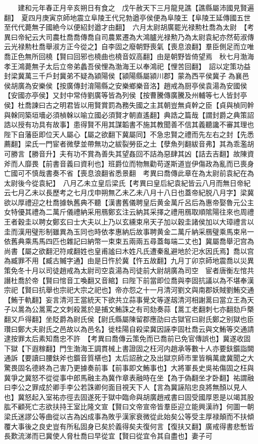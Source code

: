 　　建和元年春正月辛亥朔日有食之　戊午赦天下三月龍見譙【譙縣屬沛國見賢遍翻】　夏四月庚寅京師地震立阜陵王代兄勃遒亭侯便為阜陵王【阜陵王延傳國五世至代代薨無子國絶今以便紹封遒才由翻】　六月太尉胡廣罷光禄勲杜喬為太尉　【考異曰帝紀云大司農杜喬喬傳喬自司農累遷為大鴻臚光禄勲乃為太尉袁紀亦然荀淑傳云光禄勲杜喬舉淑方正今從之】自李固之廢朝野喪氣【喪息浪翻】羣臣側足而立唯喬正色無所回橈【賢曰回邪也橈曲也橈音奴高翻】由是朝野皆倚望焉　秋七月渤海孝王鴻薨無子太后立帝弟蠡吾侯悝為渤海王以奉鴻祀【悝苦回翻】　詔以定策功益封梁冀萬三千戶封冀弟不疑為潁陽侯【潁陽縣屬潁川郡】蒙為西平侯冀子為襄邑侯胡廣為安樂侯【按廣傳封淯陽縣之安樂鄉樂音洛】趙戒為厨亭侯袁湯為安國侯【安國亦亭侯】又封中常侍劉廣等皆為列侯【按曹騰傳廣騰及州輔等七人皆封亭侯】杜喬諫曰古之明君皆以用賢賞罰為務失國之主其朝豈無貞幹之臣【貞與楨同幹與榦同築垣墻必須楨榦以喻立國必須賢才朝直遙翻】典誥之篇哉【謂封爵之典策詔誥以授有功具有故事】患得賢不用其謀韜書不施其教聞善不信其義聽讒不審其理也陛下自藩臣即位天人屬心【屬之欲翻下冀屬同】不急忠賢之禮而先左右之封【先悉薦翻】梁氏一門宦者微孽並帶無功之紱裂勞臣之土【孽魚列翻紱音弗】其為乖濫胡可勝言【勝音升】夫有功不賞為善失其望姦回不詰為惡肆其凶【詰去吉翻】故陳資斧而人靡畏【前書音義曰資利也】班爵位而物無勸苟遂斯道豈伊傷政為亂而已喪身亡國可不慎哉書奏不省【喪息浪翻省悉景翻　考異曰喬傳此章在為太尉前袁紀在為太尉後今從袁紀】　八月乙未立皇后梁氏【考異曰皇后紀袁紀皆云八月而無日帝紀云七月乙未以長歷考之七月戊申朔無乙未乙未八月十八日也蓋帝紀脱八月字】梁冀欲以厚禮迎之杜喬據執舊典不聽【漢書舊儀聘皇后黄金萬斤呂后為惠帝娶魯元公主女特優其禮為二萬斤儀禮納采用鴈鄭玄注云納其采擇之禮用鴈取順隂陽往來也周禮王者穀圭以聘女鄭玄曰士大夫以上乃以玄纁束帛天子加以穀圭諸侯加以大璋禮言以圭而漢用璧形制雖異為玉同也時依孝惠納后故事聘黄金二萬斤納采鴈璧乘馬束帛一依舊典乘馬馬四匹也雜記曰納幣一束束五兩兩五尋蓋每端二丈也】冀屬喬舉汜宫為尚書【屬之欲翻汜符咸翻姓也皇甫謐曰木姓凡氏遭秦亂避地於汜水因氏焉】喬以宫為臧罪不用【臧古贓字通】由是日忤於冀【忤五故翻】九月丁卯京師地震喬以災異策免冬十月以司徒趙戒為太尉司空袁湯為司徒前大尉胡廣為司空　宦者唐衡左悺共譖杜喬於帝【賢曰悺音工喚翻又音綰】曰陛下前當即位喬與李固抗議以為不堪奉漢宗祀【賢曰抗舉也宗祀大宗之祀也】帝亦怨之十一月清河劉文與南郡妖賊劉鮪交通【鮪于軌翻】妄言清河王當統天下欲共立蒜事覺文等遂刼清河相謝暠曰當立王為天子以暠為公暠罵之文刺殺暠於是捕文鮪誅之有司劾奏蒜【暠工老翻刺七亦翻劾戶槩翻又戶得翻】坐貶爵為尉氏侯【尉氏縣屬陳留郡應劭曰古獄官曰尉氏鄭之别獄也臣瓚曰鄭大夫尉氏之邑故以為邑名】徙桂陽自殺梁冀因誣李固杜喬云與文鮪等交通請逮按罪太后素知喬忠不許　【考異曰喬傳云策免而已喬前已免官傳誤也】冀遂收固下獄【下遐稼翻】門生渤海王調貫械上書證固之枉河内趙承等數十人亦要鈇鑕詣闕通訴【要讀曰腰鈇斧也鑕音質椹也】太后詔赦之及出獄京師市里皆稱萬歲冀聞之大驚畏固名德終為己害乃更據奏前事【前事即文鮪事也】大將軍長史吳祐傷固之枉與冀爭之冀怒不從從事中郎馬融主為冀作章表融時在坐【為于偽翻坐才卧翻】祐謂融曰李公之罪成於卿手李公若誅卿何面目視天下人【言為冀誣陷忠良將無顏以見人也】冀怒起入室祐亦徑去固遂死于獄中臨命與胡廣趙戒書曰固受國厚恩是以竭其股肱不顧死亡志欲扶持王室比隆文宣【賢曰文帝宣帝皆羣臣迎立能興漢祚】何圖一朝梁氏迷謬公等曲從以吉為凶成事為敗乎漢家衰微從此始矣公等受主厚禄顛而不扶傾覆大事後之良史豈有所私固身已矣於義得矣夫復何言【復扶又翻】廣戒得書悲慙皆長歎流涕而已冀使人脅杜喬曰早從宜【賢曰從宜令其自盡也】妻子可